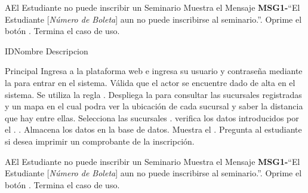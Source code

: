 		\begin{UCtrayectoriaA}{A}{El Estudiante no puede inscribir un Seminario}
			\UCpaso Muestra el Mensaje {\bf MSG1-}``El Estudiante [{\em Número de Boleta}] aun no puede inscribirse al seminario.''.
			\UCpaso[\UCactor] Oprime el botón .
			\UCpaso[] Termina el caso de uso.
		\end{UCtrayectoriaA}





\begin{UseCase}{ID}{Nombre}{
		Descripcion
	}
	\end{UseCase}

	\begin{UCtrayectoria}{Principal}
		\UCpaso[\UCactor] Ingresa a la plataforma web e ingresa su usuario y contraseña mediante la \label{CU17Login} para entrar en el sistema.
		\UCpaso Válida que el actor se encuentre dado de alta en el sistema. Se utiliza la regla  .
		\UCpaso Despliega la  para  consultar las sucursales registradas y un mapa en el cual podra ver la ubicación de cada sucursal y saber la distancia que  hay entre ellas.
		\UCpaso[\UCactor] Selecciona las sucursales \label{CU17SeleccionarSeminario}.
		\UCpaso verifica los datos introducidos por el \UCactor.  .
		\UCpaso Almacena los datos en la base de datos.
		\UCpaso Muestra el . 
		\UCpaso Pregunta al estudiante si desea imprimir un comprobante de la inscripción.		
	\end{UCtrayectoria}
		
		\begin{UCtrayectoriaA}{A}{El Estudiante no puede inscribir un Seminario}
			\UCpaso Muestra el Mensaje {\bf MSG1-}``El Estudiante [{\em Número de Boleta}] aun no puede inscribirse al seminario.''.
			\UCpaso[\UCactor] Oprime el botón .
			\UCpaso[] Termina el caso de uso.
		\end{UCtrayectoriaA}
